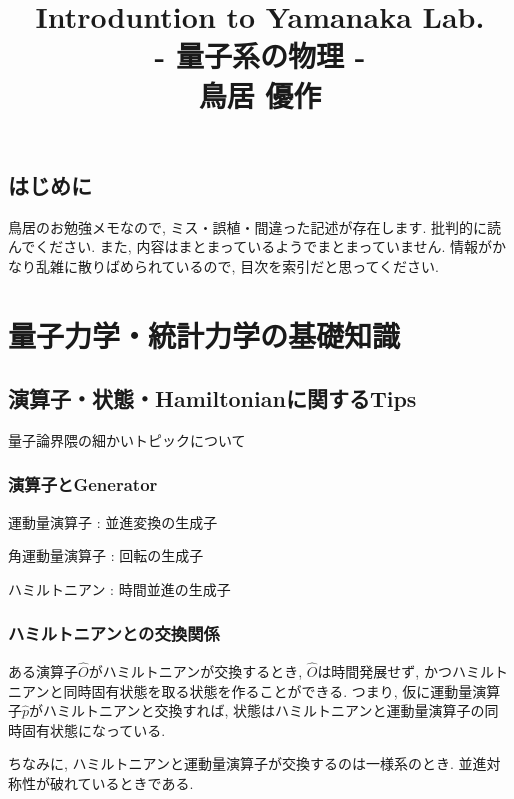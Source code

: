 \documentclass[10.5pt,a4paper]{jreport}
\title{
  \Huge Introduntion to Yamanaka Lab.\\
  \huge - 量子系の物理 -\\[1cm]
  \Large 鳥居 優作
}
\begin{document}
\maketitle
\thispagestyle{empty}
\tableofcontents
\section{はじめに}
鳥居のお勉強メモなので, ミス・誤植・間違った記述が存在します. 批判的に読んでください. また, 内容はまとまっているようでまとまっていません. 情報がかなり乱雑に散りばめられているので, 目次を索引だと思ってください. 
\chapter{量子力学・統計力学の基礎知識}
\section{演算子・状態・Hamiltonianに関するTips}
量子論界隈の細かいトピックについて
\subsection{演算子とGenerator}
運動量演算子 : 並進変換の生成子

角運動量演算子 : 回転の生成子

ハミルトニアン : 時間並進の生成子
\subsection{ハミルトニアンとの交換関係}
ある演算子$\hat{O}$がハミルトニアンが交換するとき, $\hat{O}$は時間発展せず, かつハミルトニアンと同時固有状態を取る状態を作ることができる. つまり, 仮に運動量演算子$\hat{p}$がハミルトニアンと交換すれば, 状態はハミルトニアンと運動量演算子の同時固有状態になっている.

ちなみに, ハミルトニアンと運動量演算子が交換するのは一様系のとき. 並進対称性が破れているときである. 
\end{document}
